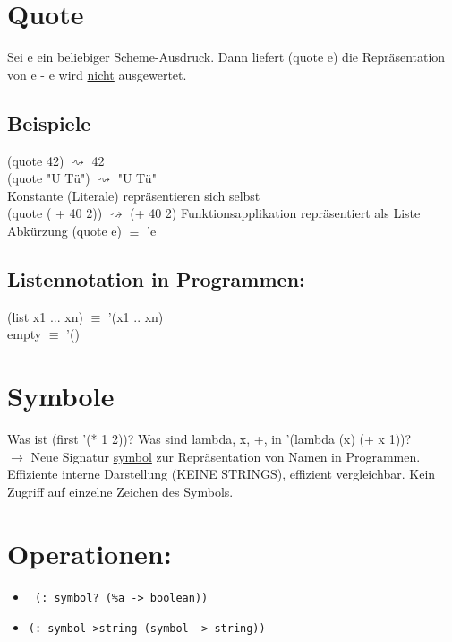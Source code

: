 \documentclass[a4paper, 20pt, openany]{book}
\begin{document}
\section{Quote}
Sei e ein beliebiger Scheme-Ausdruck. Dann liefert (quote e) die Repräsentation von e - e wird \underline{nicht} ausgewertet.
\subsection{Beispiele}
(quote 42) $\rightsquigarrow$ 42\\
(quote "U Tü") $\rightsquigarrow$ "U Tü"\\
Konstante (Literale) repräsentieren sich selbst\\
(quote ( + 40 2)) $\rightsquigarrow$ (+ 40 2) Funktionsapplikation repräsentiert als Liste\\
Abkürzung (quote e) $\equiv$ 'e\\
\subsection{Listennotation in Programmen:}
(list x1 ... xn) $\equiv$ '(x1 .. xn)\\
empty $\equiv$ '()\\
\section{Symbole}
Was ist (first '(* 1 2))? Was sind lambda, x, +, in '(lambda (x) (+ x 1))?\\
$\rightarrow$ Neue Signatur \underline{symbol} zur Repräsentation von Namen in Programmen. Effiziente interne Darstellung (KEINE STRINGS), effizient vergleichbar. Kein Zugriff auf einzelne Zeichen des Symbols.

\section{Operationen:}
\begin{itemize}
\item
\begin{lstlisting}
 (: symbol? (%a -> boolean)) 
 \end{lstlisting}
\end{itemize}
\begin{itemize}
\item
\begin{lstlisting}
(: symbol->string (symbol -> string))
\end{lstlisting}
\end{itemize}
\end{document}
